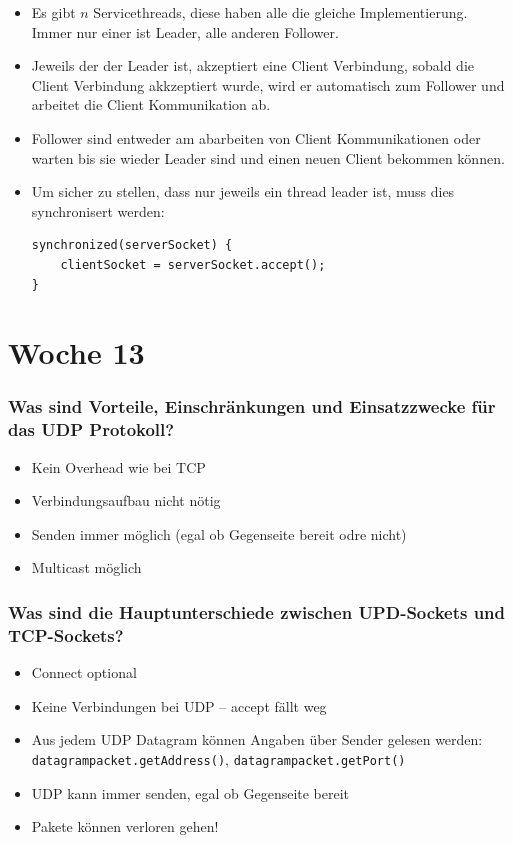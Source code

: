 \documentclass[10pt,a4paper]{scrartcl}
\begin{document}
\begin{itemize}
	\item Es gibt $n$ Servicethreads, diese haben alle die gleiche Implementierung. Immer nur einer
		ist Leader, alle anderen Follower.
	\item Jeweils der der Leader ist, akzeptiert eine Client Verbindung, sobald  die Client Verbindung
		akkzeptiert wurde, wird er automatisch zum  Follower und arbeitet die Client Kommunikation ab.
	\item Follower sind entweder am abarbeiten von Client Kommunikationen oder  warten bis sie wieder
		Leader sind und einen neuen Client bekommen können.
	\item Um sicher zu stellen, dass nur jeweils ein thread leader ist, muss dies synchronisert werden:
\begin{verbatim}
synchronized(serverSocket) {
    clientSocket = serverSocket.accept();
}
\end{verbatim}
\end{itemize}
  
  
\section{Woche 13}

\subsubsection{Was sind Vorteile, Einschränkungen und Einsatzzwecke für das UDP Protokoll?}

\begin{itemize}
	\item Kein Overhead wie bei TCP
	\item Verbindungsaufbau nicht nötig 
	\item Senden immer möglich (egal ob Gegenseite bereit odre nicht)
	\item Multicast möglich
\end{itemize}

\subsubsection{Was sind die Hauptunterschiede zwischen UPD-Sockets und TCP-Sockets?}

\begin{itemize}
	\item Connect optional
	\item Keine Verbindungen bei UDP -- accept fällt weg
	\item Aus jedem UDP Datagram können Angaben über Sender gelesen werden:
		\texttt{datagrampacket.getAddress()}, \texttt{datagrampacket.getPort()}
	\item UDP kann immer senden, egal ob Gegenseite bereit
	\item Pakete können verloren gehen!
 \end{itemize}
\end{document}
